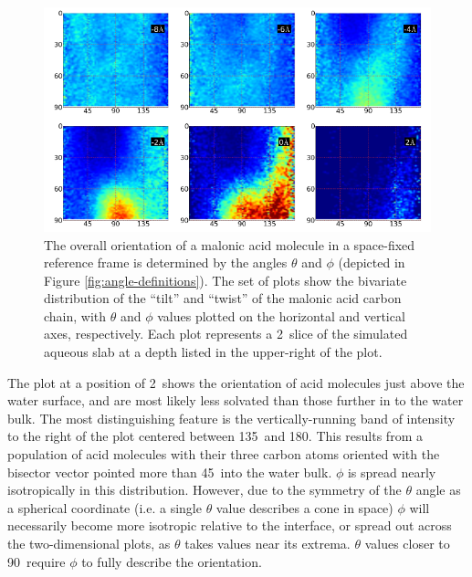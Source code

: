 \begin{figure}[h!]
	\begin{center}
		\includegraphics[scale=1.0]{images/malonic-angles/carbonbackbone-theta-phi.png}
		\caption{The overall orientation of a malonic acid molecule in a space-fixed reference frame is determined by the angles $\theta$ and $\phi$ (depicted in Figure \ref{fig:angle-definitions}). The set of plots show the bivariate distribution of the ``tilt'' and ``twist'' of the malonic acid carbon chain, with $\theta$ and $\phi$ values plotted on the horizontal and vertical axes, respectively. Each plot represents a 2\angs~slice of the simulated aqueous slab at a depth listed in the upper-right of the plot.}
		\label{fig:backbone-theta-phi}
	\end{center}
\end{figure}

The plot at a position of 2\angs~shows the orientation of acid molecules just above the water surface, and are most likely less solvated than those further in to the water bulk. The most distinguishing feature is the vertically-running band of intensity to the right of the plot centered between 135\textdegree~and 180\textdegree. This results from a population of acid molecules with their three carbon atoms oriented with the bisector vector pointed more than 45\textdegree~into the water bulk. $\phi$ is spread nearly isotropically in this distribution. However, due to the symmetry of the $\theta$ angle as a spherical coordinate (i.e. a single $\theta$ value describes a cone in space) $\phi$ will necessarily become more isotropic relative to the interface, or spread out across the two-dimensional plots, as $\theta$ takes values near its extrema. $\theta$ values closer to 90\textdegree~require $\phi$ to fully describe the orientation.

